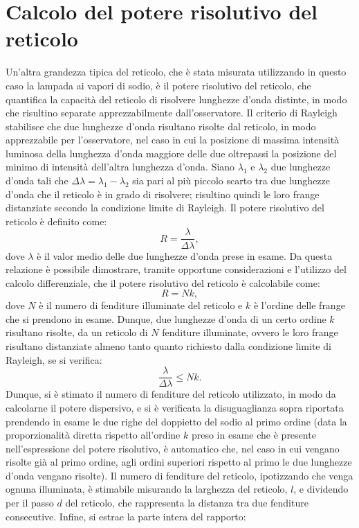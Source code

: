 \documentclass[a4paper,12pt]{article}
\begin{document}
\section{Calcolo del potere risolutivo del reticolo}
Un’altra grandezza tipica del reticolo, che è stata misurata utilizzando in questo caso la lampada ai vapori di sodio, è il potere risolutivo del reticolo, che quantifica la capacità del reticolo di risolvere lunghezze d’onda distinte, in modo che risultino separate apprezzabilmente dall’osservatore. Il criterio di Rayleigh stabilisce che due lunghezze d’onda risultano risolte dal reticolo, in modo apprezzabile per l’osservatore, nel caso in cui la posizione di massima intensità luminosa della lunghezza d’onda maggiore delle due oltrepassi la posizione del minimo di intensità dell’altra lunghezza d’onda.
Siano \( \lambda_1 \) e \( \lambda_2 \) due lunghezze d’onda tali che \( \Delta\lambda = \lambda_1 - \lambda_2 \) sia pari al più piccolo scarto tra due lunghezze d’onda che il reticolo è in grado di risolvere; risultino quindi le loro frange distanziate secondo la condizione limite di Rayleigh.
Il potere risolutivo del reticolo è definito come:
\[
R = \frac{\lambda}{\Delta\lambda},
\]
dove \( \lambda \) è il valor medio delle due lunghezze d’onda prese in esame.
Da questa relazione è possibile dimostrare, tramite opportune considerazioni e l’utilizzo del calcolo differenziale, che il potere risolutivo del reticolo è calcolabile come:
\[
R = Nk,
\]
dove \( N \) è il numero di fenditure illuminate del reticolo e \( k \) è l’ordine delle frange che si prendono in esame.
Dunque, due lunghezze d’onda di un certo ordine \( k \) risultano risolte, da un reticolo di \( N \) fenditure illuminate, ovvero le loro frange risultano distanziate almeno tanto quanto richiesto dalla condizione limite di Rayleigh, se si verifica:
\[
\frac{\lambda}{\Delta\lambda} \leq Nk.
\]
Dunque, si è stimato il numero di fenditure del reticolo utilizzato, in modo da calcolarne il potere dispersivo, e si è verificata la disuguaglianza sopra riportata prendendo in esame le due righe del doppietto del sodio al primo ordine (data la proporzionalità diretta rispetto all’ordine \( k \) preso in esame che è presente nell’espressione del potere risolutivo, è automatico che, nel caso in cui vengano risolte già al primo ordine, agli ordini superiori rispetto al primo le due lunghezze d’onda vengano risolte).
Il numero di fenditure del reticolo, ipotizzando che venga ognuna illuminata, è stimabile misurando la larghezza del reticolo, \( l \), e dividendo per il passo \( d \) del reticolo, che rappresenta la distanza tra due fenditure consecutive. Infine, si estrae la parte intera del rapporto:
\end{document}
